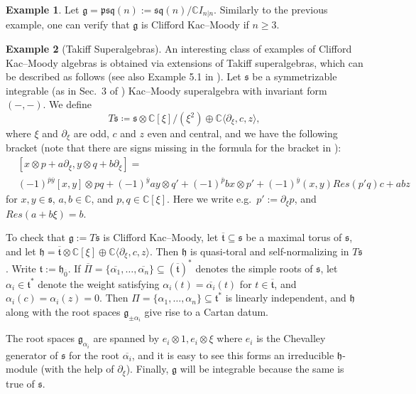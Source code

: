 \documentclass[12pt, a4paper, reqno]{amsart}
\def\C{\mathbb{C}}
\def\p{\mathfrak{p}}
\def\q{\mathfrak{q}}
\def\g{\mathfrak{g}}
\def\h{\mathfrak{h}}
\def\s{\mathfrak{s}}
\def\ol{\overline}
\def\d{\partial}
\theoremstyle{definition}
\theoremstyle{definition}
\theoremstyle{definition}
\newtheorem{example}{Example}}
\numberwithin{theorem}{section}
\numberwithin{lemma}{section}
\numberwithin{remark}{section}
\numberwithin{definition}{section}
\numberwithin{corollary}{section}
\numberwithin{proposition}{section}
\numberwithin{example}{section}
\begin{document}
	\begin{example}\label{example_psq(n)}
		Let $\g=\p\s\q(n):=\s\q(n)/\C I_{n|n}$.  Similarly to the previous example, one can verify that $\g$ is Clifford Kac--Moody if $n\geq3$.
	\end{example}
	
	
	
	\begin{example}[Takiff Superalgebras]\label{example-takiff}
		An interesting class of examples of Clifford Kac--Moody algebras is obtained via extensions of Takiff superalgebras, which can be described as follows (see also Example 5.1 in \cite{S2}).  Let \(\mathfrak{s}\) be a symmetrizable integrable (as in Sec.~3 of \cite{CS}) Kac--Moody superalgebra with invariant form \((-,-)\).  We define 
		\[
		T\mathfrak{s} \coloneq \mathfrak{s}\otimes\mathbb{C}[\xi]/(\xi^2)\oplus \mathbb{C}\langle\partial_\xi,c,z\rangle,
		\]
		where \(\xi\) and \(\partial_\xi\) are odd, \(c\) and \(z\) even and central, and we have the following bracket (note that there are signs missing in the formula for the bracket in \cite{S2}):
		\begin{align*}
			&[x\otimes p+ a\partial_\xi  , y\otimes q+ b\partial_\xi] = \\ & (-1)^{\ol{p}\ol{y}}[x,y]\otimes pq+(-1)^{\ol{y}}ay\otimes q'+(-1)^{\ol{p}}bx\otimes p'+(-1)^{\ol{y}}(x,y)Res(p'q)c + abz 
		\end{align*}		
		for \(x,y \in \mathfrak{s}\), \(a,b \in \mathbb{C}\), and $p,q\in\C[\xi]$.	Here we write e.g.~$p':=\d_{\xi}p$, and $Res(a+b\xi)=b$.
		
		To check that \(\g:=T\mathfrak{s}\) is Clifford Kac--Moody, let $\ol{\mathfrak{t}}\subseteq\s$ be a maximal torus of $\s$, and let $\h=\ol{\mathfrak{t}}\otimes\C[\xi]\oplus\C\langle\d_{\xi},c,z\rangle$.  Then $\h$ is quasi-toral and self-normalizing in $T\s$.  Write $\mathfrak{t}:=\h_{\ol{0}}$.  If $\ol{\Pi}=\{\ol{\alpha_1},\dots,\ol{\alpha_n}\}\subseteq(\ol{\mathfrak{t}})^{*}$ denotes the simple roots of $\s$, let $\alpha_i\in\mathfrak{t}^*$ denote the weight satisfying $\alpha_i(t)=\ol{\alpha_i}(t)$ for $t\in\ol{\mathfrak{t}}$, and $\alpha_i(c)=\alpha_i(z)=0$.  Then $\Pi=\{\alpha_1,\dots,\alpha_n\}\subseteq\mathfrak{t}^*$ is linearly independent, and $\h$ along with the root spaces $\g_{\pm\alpha_i}$ give rise to a Cartan datum.  
		
		The root spaces $\g_{\alpha_i}$ are spanned by $e_{i}\otimes1,e_i\otimes\xi$ where $e_i$ is the Chevalley generator of $\s$ for the root $\ol{\alpha_i}$, and it is easy to see this forms an irreducible $\h$-module (with the help of $\d_{\xi}$).  Finally, $\g$ will be integrable because the same is true of $\s$.  
		

\end{example}
\end{document}
